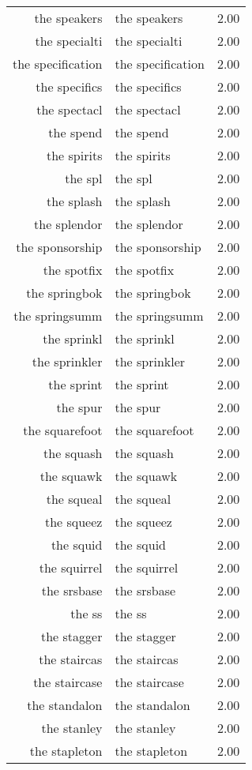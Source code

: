 \begin{table}[ht]
\begin{tabular}{rlr}
  the speakers & the speakers & 2.00 \\ 
  the specialti & the specialti & 2.00 \\ 
  the specification & the specification & 2.00 \\ 
  the specifics & the specifics & 2.00 \\ 
  the spectacl & the spectacl & 2.00 \\ 
  the spend & the spend & 2.00 \\ 
  the spirits & the spirits & 2.00 \\ 
  the spl & the spl & 2.00 \\ 
  the splash & the splash & 2.00 \\ 
  the splendor & the splendor & 2.00 \\ 
  the sponsorship & the sponsorship & 2.00 \\ 
  the spotfix & the spotfix & 2.00 \\ 
  the springbok & the springbok & 2.00 \\ 
  the springsumm & the springsumm & 2.00 \\ 
  the sprinkl & the sprinkl & 2.00 \\ 
  the sprinkler & the sprinkler & 2.00 \\ 
  the sprint & the sprint & 2.00 \\ 
  the spur & the spur & 2.00 \\ 
  the squarefoot & the squarefoot & 2.00 \\ 
  the squash & the squash & 2.00 \\ 
  the squawk & the squawk & 2.00 \\ 
  the squeal & the squeal & 2.00 \\ 
  the squeez & the squeez & 2.00 \\ 
  the squid & the squid & 2.00 \\ 
  the squirrel & the squirrel & 2.00 \\ 
  the srsbase & the srsbase & 2.00 \\ 
  the ss & the ss & 2.00 \\ 
  the stagger & the stagger & 2.00 \\ 
  the staircas & the staircas & 2.00 \\ 
  the staircase & the staircase & 2.00 \\ 
  the standalon & the standalon & 2.00 \\ 
  the stanley & the stanley & 2.00 \\ 
  the stapleton & the stapleton & 2.00 \\ 

\end{tabular}
\end{table}

